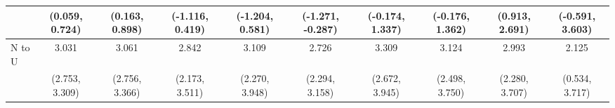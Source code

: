 {\begin{tabular}{l|c|c|c|c|c|c|c|c|c}
& {\scriptsize (0.059, 0.724)}
& {\scriptsize (0.163, 0.898)}
& {\scriptsize (-1.116, 0.419)}
& {\scriptsize (-1.204, 0.581)}
& {\scriptsize (-1.271, -0.287)}
& {\scriptsize (-0.174, 1.337)}
& {\scriptsize (-0.176, 1.362)}
& {\scriptsize (0.913, 2.691)}
& {\scriptsize (-0.591, 3.603)}
\\ [0.1cm]
\hline
N to U
& 3.031 & 3.061 & 2.842 & 3.109 & 2.726 & 3.309 & 3.124 & 2.993 & 2.125 \\
& {\scriptsize (2.753, 3.309)}
& {\scriptsize (2.756, 3.366)}
& {\scriptsize (2.173, 3.511)}
& {\scriptsize (2.270, 3.948)}
& {\scriptsize (2.294, 3.158)}
& {\scriptsize (2.672, 3.945)}
& {\scriptsize (2.498, 3.750)}
& {\scriptsize (2.280, 3.707)}
& {\scriptsize (0.534, 3.717)}
\\ [0.1cm]
\hline
\hline
\end{tabular}
}
